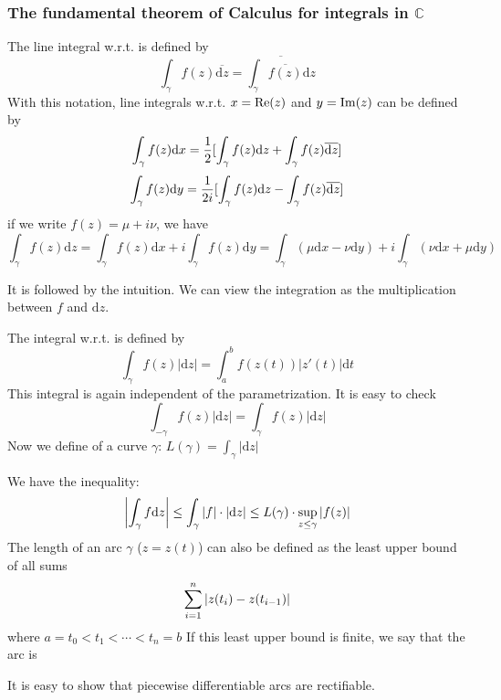 \subsubsection{The fundamental theorem of Calculus for integrals in  $ \mathbb{C} $}
The line integral w.r.t.   is defined by 
\[\int_\gamma f(z)\overline{\mathrm{d}{z}}=\overline{\int_\gamma \overline{f(z)}\mathrm{d}z} \] 
With this notation, line integrals w.r.t.  $ x=\mathrm{Re}(z) $ and  $ y=\mathrm{Im}(z) $ can be defined by 
\[\int_\gamma f(z)\mathrm{d}x=\displaystyle\frac{1}{2}[\int_\gamma f(z)\mathrm{d}z+\int_\gamma f(z)\overline{\mathrm{d}z}]\]
\[\int_\gamma f(z)\mathrm{d}y=\displaystyle\frac{1}{2 i}[\int_\gamma f(z)\mathrm{d}z-\int_\gamma f(z)\overline{\mathrm{d}z}]\]
if we write  $ f(z)=\mu+i\nu $, we have 
\[\int_\gamma f(z)\mathrm{d}z=\int_\gamma f(z)\mathrm{d}x+i\int_\gamma f(z)\mathrm{d}y=\int_\gamma(\mu\mathrm{d}x-\nu\mathrm{d}y)+i\int_\gamma(\nu\mathrm{d}x+\mu\mathrm{d}y)\]   
\begin{remark}
    It is followed by the intuition. We can view the integration as the multiplication between  $ f $ and  $ \mathrm{d}z $. 
\end{remark}

The integral w.r.t.  is defined by 
\[\int_\gamma f(z)|\mathrm{d}z|=\int_a^bf(z(t))|z'(t)|\mathrm{d}t\]
This integral is again independent of the parametrization. It is easy to check 
\[\int_{-\gamma}f(z)|\mathrm{d}z|=\int_\gamma f(z)|\mathrm{d}z|\]
Now we define  of a curve  $ \gamma $: $ L(\gamma)=\int_\gamma |\mathrm{d}z| $ 

We have the inequality: 
\[\displaystyle\left|\int_\gamma f\mathrm{d}z\right| \leq \int_\gamma |f| \cdot|\mathrm{d}z| \leq L(\gamma)\cdot \sup\limits_{z \leq \gamma}|f(z)|\]
The length of an arc  $ \gamma $ ($ z=z(t) $) can also be defined as the least upper bound of all sums 
\[\displaystyle\sum_{i=1}^n |z(t_i)-z(t_{i-1})|\]
where  $ a=t_0<t_1<\cdots<t_n=b $ 
If this least upper bound is finite, we say that the arc is 

It is easy to show that piecewise differentiable arcs are rectifiable.

